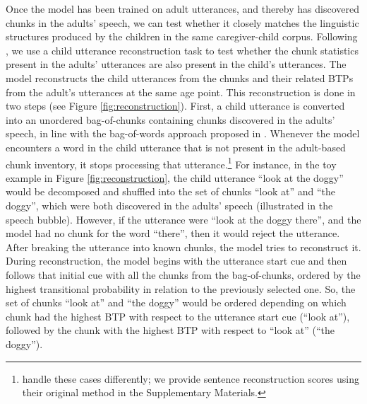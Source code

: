 \documentclass{article}
\begin{document}
Once the model has been trained on adult utterances, and thereby has discovered chunks in the adults' speech, we can test whether it closely matches the linguistic structures produced by the children in the same caregiver-child corpus. Following , we use a child utterance reconstruction task to test whether the chunk statistics present in the adults' utterances are also present in the child's utterances. The model reconstructs the child utterances from the chunks and their related BTPs from the adult's utterances at the same age point. This reconstruction is done in two steps (see Figure \ref{fig:reconstruction}). First, a child utterance is converted into an unordered bag-of-chunks containing chunks discovered in the adults' speech, in line with the bag-of-words approach proposed in . Whenever the model encounters a word in the child utterance that is not present in the adult-based chunk inventory, it stops processing that utterance.\footnote{ handle these cases differently; we provide sentence reconstruction scores using their original method in the Supplementary Materials.} For instance, in the toy example in Figure \ref{fig:reconstruction}, the child utterance ``look at the doggy'' would be decomposed and shuffled into the set of chunks ``look at'' and ``the doggy'', which were both discovered in the adults' speech (illustrated in the speech bubble). However, if the utterance were ``look at the doggy there'', and the model had no chunk for the word ``there'', then it would reject the utterance. After breaking the utterance into known chunks, the model tries to reconstruct it. During reconstruction, the model begins with the utterance start cue and then follows that initial cue with all the chunks from the bag-of-chunks, ordered by the highest transitional probability in relation to the previously selected one. So, the set of chunks ``look at'' and ``the doggy'' would be ordered depending on which chunk had the highest BTP with respect to the utterance start cue (``look at''), followed by the chunk with the highest BTP with respect to ``look at'' (``the doggy'').
\end{document}
